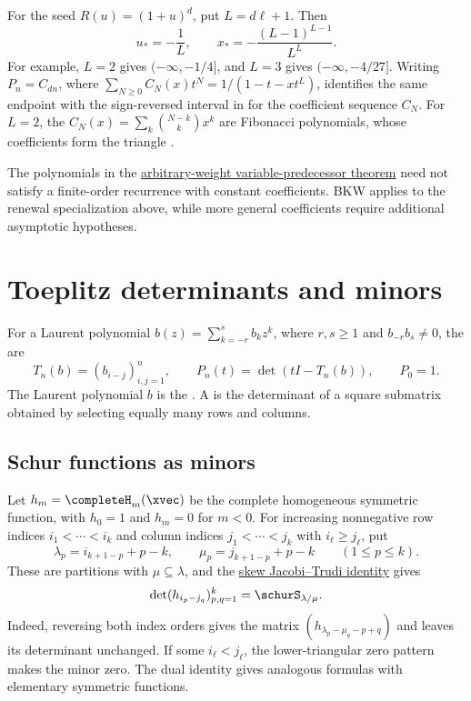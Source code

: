 For the seed $R(u)=(1+u)^d$, put $L=d\ell+1$.
Then
\[
 u_*=-\frac1L,\qquad
 x_*=-\frac{(L-1)^{L-1}}{L^L}.
\]
For example, $L=2$ gives $(-\infty,-1/4]$, and $L=3$ gives
$(-\infty,-4/27]$.
Writing $P_n=C_{dn}$, where $\sum_{N\geq0}C_N(x)t^N=1/(1-t-xt^L)$,
identifies the same endpoint with the sign-reversed interval in
\cite[Thm.~1]{ForgcsTran2016} for the coefficient sequence $C_N$.
For $L=2$, the $C_N(x)=\sum_k\binom{N-k}{k}x^k$ are Fibonacci polynomials,
whose coefficients form the triangle .

The polynomials in the
\hyperref[interlacingDelayRecurrences]{arbitrary-weight variable-predecessor theorem}
need not satisfy a finite-order recurrence with constant coefficients.
BKW applies to the renewal specialization above, while more general
coefficients require additional asymptotic hypotheses.

\section[toeplitzMinors]{Toeplitz determinants and minors}

For a Laurent polynomial $b(z)=\sum_{k=-r}^s b_kz^k$, where
$r,s\geq1$ and $b_{-r}b_s\ne0$, the  are
\[
 T_n(b)=(b_{i-j})_{i,j=1}^n,\qquad
 P_n(t)=\det(tI-T_n(b)),\qquad P_0=1.
\]
The Laurent polynomial $b$ is the .
A  is the determinant of a square submatrix obtained
by selecting equally many rows and columns.

\subsection[toeplitzSchurMinors]{Schur functions as minors}

Let $h_m=\completeH_m(\xvec)$ be the complete homogeneous symmetric function,
with $h_0=1$ and $h_m=0$ for $m<0$.
For increasing nonnegative row indices $i_1<\dotsb<i_k$ and column indices
$j_1<\dotsb<j_k$ with $i_\ell\geq j_\ell$, put
\[
 \lambda_p=i_{k+1-p}+p-k,\qquad
 \mu_p=j_{k+1-p}+p-k\qquad(1\leq p\leq k).
\]
These are partitions with $\mu\subseteq\lambda$, and the
\hyperref[skewJacobiTrudi]{skew Jacobi--Trudi identity} gives
\[
 \det(h_{i_p-j_q})_{p,q=1}^k=\schurS_{\lambda/\mu}.
\]
Indeed, reversing both index orders gives the matrix
$(h_{\lambda_p-\mu_q-p+q})$ and leaves its determinant unchanged.
If some $i_\ell<j_\ell$, the lower-triangular zero pattern makes the minor zero.
The dual identity gives analogous formulas with elementary symmetric functions.

